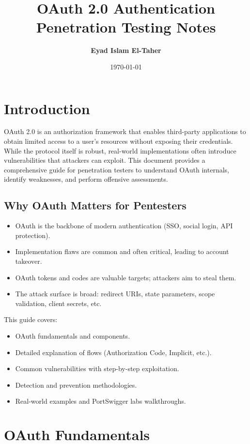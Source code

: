 \documentclass[12pt,a4paper]{article}
\title{\Huge \textbf{OAuth 2.0 Authentication} \\[0.5cm]
\Large Penetration Testing Notes}
\author{\textbf{Eyad Islam El-Taher}}
\date{\today}
\begin{document}
\maketitle
\thispagestyle{empty}
\newpage

\tableofcontents
\newpage

\section{Introduction}
OAuth 2.0 is an authorization framework that enables third-party applications to obtain limited access to a user's resources without exposing their credentials. While the protocol itself is robust, real-world implementations often introduce vulnerabilities that attackers can exploit. This document provides a comprehensive guide for penetration testers to understand OAuth internals, identify weaknesses, and perform offensive assessments.

\subsection{Why OAuth Matters for Pentesters}
\begin{itemize}
    \item OAuth is the backbone of modern authentication (SSO, social login, API protection).
    \item Implementation flaws are common and often critical, leading to account takeover.
    \item OAuth tokens and codes are valuable targets; attackers aim to steal them.
    \item The attack surface is broad: redirect URIs, state parameters, scope validation, client secrets, etc.
\end{itemize}

This guide covers:
\begin{itemize}
    \item OAuth fundamentals and components.
    \item Detailed explanation of flows (Authorization Code, Implicit, etc.).
    \item Common vulnerabilities with step-by-step exploitation.
    \item Detection and prevention methodologies.
    \item Real-world examples and PortSwigger labs walkthroughs.
\end{itemize}

\section{OAuth Fundamentals}
\end{document}
